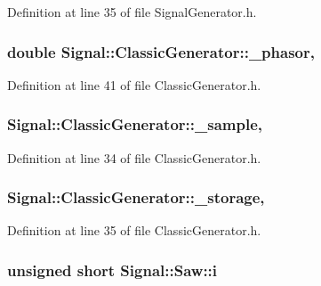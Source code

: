 Definition at line 35 of file Signal\+Generator.\+h.

\hypertarget{classSignal_1_1ClassicGenerator_ade9b66bc49d2d2f40a1390fc6374b8b2}{
\subsubsection[{\+\_\+phasor}]{\setlength{\rightskip}{0pt plus 5cm}double Signal\+::\+Classic\+Generator\+::\+\_\+phasor\hspace{0.3cm}{\ttfamily [protected]}, {\ttfamily [inherited]}}}\label{classSignal_1_1ClassicGenerator_ade9b66bc49d2d2f40a1390fc6374b8b2}


Definition at line 41 of file Classic\+Generator.\+h.

\hypertarget{classSignal_1_1ClassicGenerator_a40313d0d806d6e44af7d41b3ef3a0822}{
\subsubsection[{\+\_\+sample}]{ Signal\+::\+Classic\+Generator\+::\+\_\+sample\hspace{0.3cm}{\ttfamily [protected]}, {\ttfamily [inherited]}}}\label{classSignal_1_1ClassicGenerator_a40313d0d806d6e44af7d41b3ef3a0822}


Definition at line 34 of file Classic\+Generator.\+h.

\hypertarget{classSignal_1_1ClassicGenerator_a1214faf589eccb01631700723900bbf9}{
\subsubsection[{\+\_\+storage}]{ Signal\+::\+Classic\+Generator\+::\+\_\+storage\hspace{0.3cm}{\ttfamily [protected]}, {\ttfamily [inherited]}}}\label{classSignal_1_1ClassicGenerator_a1214faf589eccb01631700723900bbf9}


Definition at line 35 of file Classic\+Generator.\+h.

\hypertarget{classSignal_1_1Saw_a50612c8009e428dccb3e4b3b798bdf3d}{
\subsubsection[{i}]{\setlength{\rightskip}{0pt plus 5cm}unsigned short Signal\+::\+Saw\+::i\hspace{0.3cm}{\ttfamily [protected]}}}\label{classSignal_1_1Saw_a50612c8009e428dccb3e4b3b798bdf3d}


